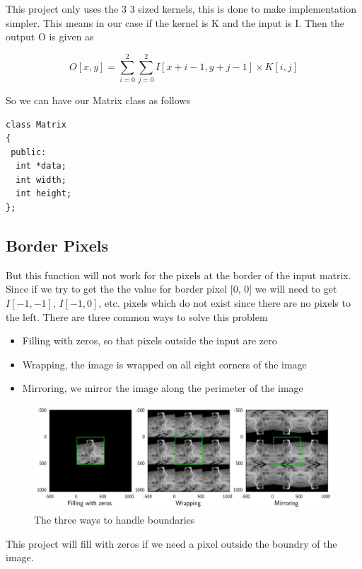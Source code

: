 \documentclass[a4paper,oneside,12pt]{report}
\begin{document}
This project only uses the 3 \texttimes{} 3 sized kernels, this is done to make implementation simpler. This means in our case if the kernel is K and the input is I. Then the output O is given as

\[ O[x,y] = \sum_{i=0}^{2} \sum_{j=0}^{2} I[x + i - 1, y + j - 1] \times K[i,j] \]

So we can have our Matrix class as follows
\begin{verbatim}
class Matrix
{
 public:
  int *data;
  int width;
  int height;
};
\end{verbatim}

\subsection{Border Pixels}
\label{sec:orga0ffe22}
But this function will not work for the pixels at the border of the input matrix. Since if we try to get the the value for border pixel [0, 0] we will need to get \(I[-1, -1]\), \(I[-1, 0]\), etc. pixels which do not exist since there are no pixels to the left. There are three common ways to solve this problem
\begin{itemize}
\item Filling with zeros, so that pixels outside the input are zero
\item Wrapping, the image is wrapped on all eight corners of the image
\item Mirroring, we mirror the image along the perimeter of the image
\end{itemize}

\begin{figure}[htbp]
\centering
\includegraphics[width=.9\linewidth]{Sobel_Filter/2025-04-22_19-58-37_2025-04-22_19-55-12_boundaries-hypotheses.png}
\caption{\label{fig:orgddc0a97}The three ways to handle boundaries}
\end{figure}

This project will fill with zeros if we need a pixel outside the boundry of the image.
\end{document}
